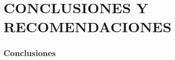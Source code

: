 \setcounter{chapter}{5}
\setcounter{section}{0}
\part{CONCLUSIONES Y RECOMENDACIONES}

\section{Conclusiones}


\begin{itemize}
	
	
	
	
	
	

\end{itemize}
